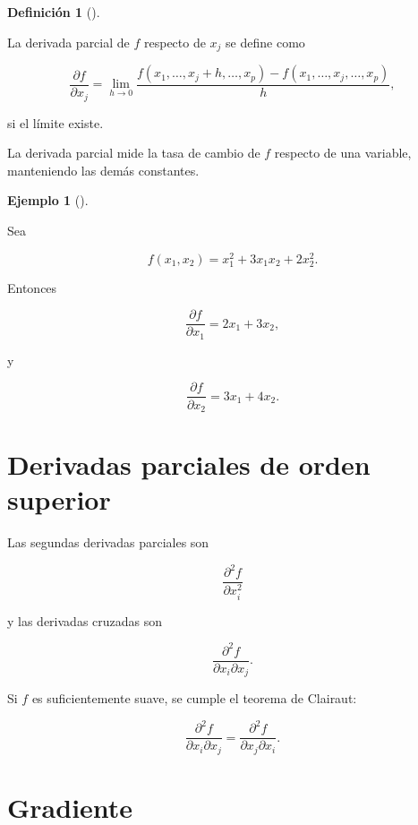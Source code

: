 \documentclass[
  spanish,
  11pt,
  letterpaper,
  DIV=11,
  numbers=noendperiod]{scrreprt}
\theoremstyle{definition}
\newtheorem{definition}{Definición}[chapter]
\theoremstyle{plain}
\theoremstyle{definition}
\newtheorem{example}{Ejemplo}[chapter]
\theoremstyle{remark}
\begin{document}
\begin{definition}[]\protect\hypertarget{def-derivada-parcial}{}\label{def-derivada-parcial}

La derivada parcial de \(f\) respecto de \(x_j\) se define como

\[
\frac{\partial f}{\partial x_j}
=
\lim_{h\to 0}
\frac{
f(x_1,\ldots,x_j+h,\ldots,x_p)
-
f(x_1,\ldots,x_j,\ldots,x_p)
}{
h
},
\]

si el límite existe.

\end{definition}

La derivada parcial mide la tasa de cambio de \(f\) respecto de una
variable, manteniendo las demás constantes.

\begin{example}[]\protect\hypertarget{exm-derivadas-parciales}{}\label{exm-derivadas-parciales}

Sea

\[
f(x_1,x_2)
=
x_1^2+3x_1x_2+2x_2^2.
\]

Entonces

\[
\frac{\partial f}{\partial x_1}
=
2x_1+3x_2,
\]

y

\[
\frac{\partial f}{\partial x_2}
=
3x_1+4x_2.
\]

\end{example}

\section{Derivadas parciales de orden
superior}\label{derivadas-parciales-de-orden-superior}

Las segundas derivadas parciales son

\[
\frac{\partial^2 f}{\partial x_i^2}
\]

y las derivadas cruzadas son

\[
\frac{\partial^2 f}
{\partial x_i\partial x_j}.
\]

Si \(f\) es suficientemente suave, se cumple el teorema de Clairaut:

\[
\frac{\partial^2 f}
{\partial x_i\partial x_j}
=
\frac{\partial^2 f}
{\partial x_j\partial x_i}.
\]

\section{Gradiente}\label{gradiente}
\end{document}
